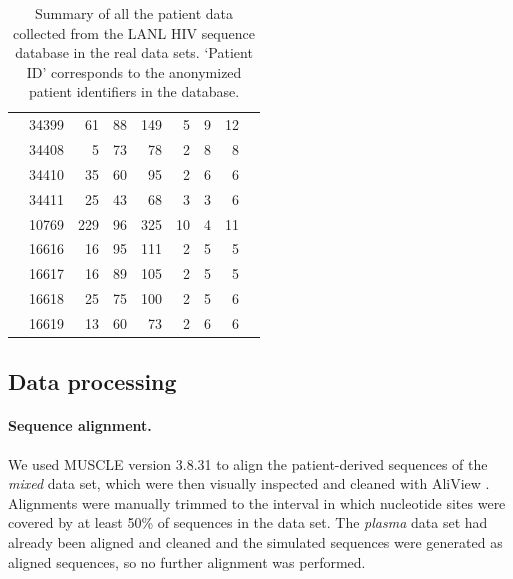 \documentclass[12pt]{article}
\begin{document}
\begin{table}
\begin{center}
\begin{tabular}{llrrrrrrr}
& 34399 &      61 &       88 &      149 &        5 &        9 &       12 \\
& 34408 &       5 &       73 &       78 &        2 &        8 &        8 \\
& 34410 &      35 &       60 &       95 &        2 &        6 &        6 \\
& 34411 &      25 &       43 &       68 &        3 &        3 &        6   \\
\cite{Fischer04} & 10769 &    229 &       96 &      325 &       10 &        4 &       11 \\ 
\cite{Llewellyn06} & 16616 &     16 &       95 &      111 &        2 &        5 &        5 \\
& 16617 &     16 &       89 &      105 &        2 &        5 &        5 \\
& 16618 &     25 &       75 &      100 &        2 &        5 &        6 \\
& 16619 &     13 &       60 &       73 &        2 &        6 &        6 \\
\hline
\end{tabular}
\end{center}
  \caption{
  {Summary of all the patient data collected from the LANL HIV sequence database \cite{LosAlamos} in the real data sets.}
  `Patient ID' corresponds to the anonymized patient identifiers in the database.
   }\label{tab:patients} 
\end{table}


\subsection * {Data processing}

\paragraph{Sequence alignment.} \label{subsec:seqalign}
We used MUSCLE version 3.8.31 \cite{Muscle04} to align the patient-derived sequences of the \emph{mixed} data set, which were then visually inspected and cleaned with AliView \cite{AliView14}. 
Alignments were manually trimmed to the interval in which nucleotide sites were covered by at least 50\% of sequences in the data set.
The \emph{plasma} data set had already been aligned and cleaned \cite{McCloskey14} and the simulated sequences were generated as aligned sequences, so no further alignment was performed.
\end{document}
